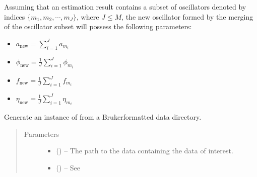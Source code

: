 \documentclass[letterpaper,10pt,english]{sphinxmanual}
\begin{document}
\begin{fulllineitems}
\begin{fulllineitems}
\sphinxAtStartPar
Assuming that an estimation result contains a subset of oscillators
denoted by indices \(\{m_1, m_2, \cdots, m_J\}\), where
\(J \leq M\), the new oscillator formed by the merging of the
oscillator subset will possess the following parameters:
\begin{itemize}
\item {} 
\sphinxAtStartPar
\(a_{\mathrm{new}} = \sum_{i=1}^J a_{m_i}\)

\item {} 
\sphinxAtStartPar
\(\phi_{\mathrm{new}} = \frac{1}{J} \sum_{i=1}^J
\phi_{m_i}\)

\item {} 
\sphinxAtStartPar
\(f_{\mathrm{new}} = \frac{1}{J} \sum_{i=1}^J f_{m_i}\)

\item {} 
\sphinxAtStartPar
\(\eta_{\mathrm{new}} = \frac{1}{J} \sum_{i=1}^J
\eta_{m_i}\)

\end{itemize}

\end{fulllineitems}


\begin{fulllineitems}
\label{\detokenize{references/core:nmrespy.core.Estimator.new_bruker}}
\sphinxAtStartPar
Generate an instance of {\hyperref[\detokenize{references/core:nmrespy.core.Estimator}]{}} from a
Bruker\sphinxhyphen{}formatted data directory.
\begin{quote}\begin{description}
\item[{Parameters}] \leavevmode\begin{itemize}
\item {} 
\sphinxAtStartPar
{} () – The path to the data containing the data of interest.

\item {} 
\sphinxAtStartPar
{} () – See 


\end{itemize}
\end{description}
\end{quote}
\end{fulllineitems}
\end{fulllineitems}
\end{document}
